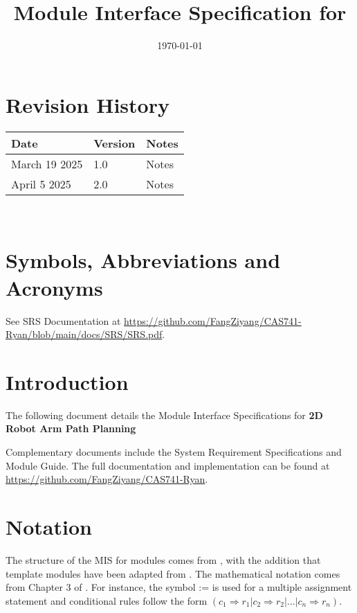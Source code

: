 \documentclass[12pt, titlepage]{article}
\begin{document}
\title{Module Interface Specification for \progname{}}

\author{\authname}

\date{\today}

\maketitle


\section{Revision History}

\begin{tabularx}{\textwidth}{p{3cm}p{2cm}X}
\toprule {\bf Date} & {\bf Version} & {\bf Notes}\\
\midrule
March 19 2025 & 1.0 & Notes\\
April 5 2025 & 2.0 & Notes\\
\bottomrule
\end{tabularx}

~\newpage

\section{Symbols, Abbreviations and Acronyms}

See SRS Documentation at \url{https://github.com/FangZiyang/CAS741-Ryan/blob/main/docs/SRS/SRS.pdf}.


\newpage

\tableofcontents

\newpage


\section{Introduction}


The following document details the Module Interface Specifications for
\textbf{2D Robot Arm Path Planning} 

Complementary documents include the System Requirement Specifications
and Module Guide.  The full documentation and implementation can be
found at \url{https://github.com/FangZiyang/CAS741-Ryan}. 




\section{Notation}
The structure of the MIS for modules comes from \citet{HoffmanAndStrooper1995},
with the addition that template modules have been adapted from
\cite{GhezziEtAl2003}.  The mathematical notation comes from Chapter 3 of
\citet{HoffmanAndStrooper1995}.  For instance, the symbol := is used for a
multiple assignment statement and conditional rules follow the form $(c_1
\Rightarrow r_1 | c_2 \Rightarrow r_2 | ... | c_n \Rightarrow r_n )$.
\end{document}
